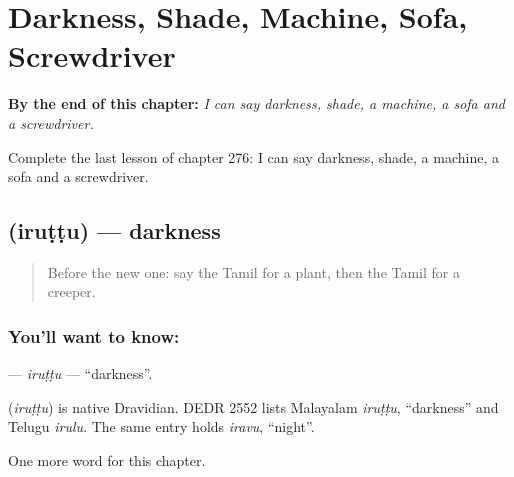 
\chapter{Darkness, Shade, Machine, Sofa, Screwdriver}
\label{ch:ta-darkness-shade-machine-sofa-screwdriver}

\begin{chapteropening}
\textbf{By the end of this chapter:} \emph{I can say darkness, shade, a machine, a sofa and a screwdriver.}

Complete the last lesson of chapter 276: I can say darkness, shade, a machine, a sofa and a screwdriver.
\end{chapteropening}

\section[\texorpdfstring{\ta{இருட்டு} (iruṭṭu)}{இருட்டு (iruṭṭu)}]{ (iruṭṭu) — darkness}

\label{lesson:TA-C276-iruttu}



\begin{quote}
Before the new one: say the Tamil for a plant, then the Tamil for a creeper.
\end{quote}

\subsection*{You'll want to know: }
\textbf{} — \emph{iruṭṭu} — \textquotedblleft{}darkness\textquotedblright{}.

\begin{cousinweb}
\textbf{} (\emph{iruṭṭu}) is native Dravidian. DEDR 2552 lists Malayalam \emph{iruṭṭu}, \textquotedblleft{}darkness\textquotedblright{} and Telugu \emph{irulu}. The same entry holds \emph{iravu}, \textquotedblleft{}night\textquotedblright{}.
\end{cousinweb}

\begin{grammarlens}[title={What you've built}]
One more word for this chapter.
\end{grammarlens}

